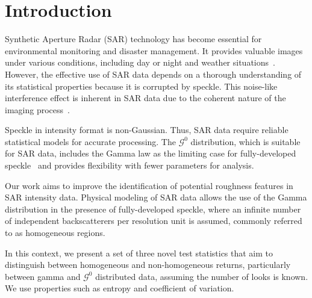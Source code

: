 \documentclass[remotesensing,article,submit,moreauthors,pdftex]{Definitions/mdpi}
\begin{document}

\newcommand{\bias}{\operatorname{Bias}}
\newcommand{\widebar}[1]{\overline{#1}}

\section{Introduction}\label{sec:Introduction}

Synthetic Aperture Radar (SAR) technology has become essential for
environmental monitoring and disaster management. It provides valuable
images under various conditions, including day or night and weather
situations~\cite{Moreira2013,Mu2019}. However, the effective use of SAR
data depends on a thorough understanding of its statistical properties
because it is corrupted by speckle. This noise-like interference effect
is inherent in SAR data due to the coherent nature of the imaging
process~\cite{Argenti2013}.

Speckle in intensity format is non-Gaussian. Thus, SAR data require
reliable statistical models for accurate processing. The
\(\mathcal{G}^0\) distribution, which is suitable for SAR data, includes
the Gamma law as the limiting case for fully-developed
speckle~\cite{Ferreira2020} and provides flexibility with fewer
parameters for analysis.

Our work aims to improve the identification of potential roughness
features in SAR intensity data. Physical modeling of SAR data allows the
use of the Gamma distribution in the presence of fully-developed
speckle, where an infinite number of independent backscatterers per
resolution unit is assumed, commonly referred to as homogeneous regions.

In this context, we present a set of three novel test statistics that
aim to distinguish between homogeneous and non-homogeneous returns,
particularly between gamma and \(\mathcal{G}^0\) distributed data,
assuming the number of looks is known. We use properties such as entropy
and coefficient of variation.
\end{document}
